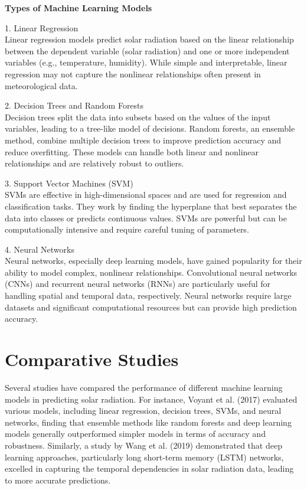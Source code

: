 \documentclass[12pt,a4paper]{report}
\begin{document}
\textbf{Types of Machine Learning Models}

1. Linear Regression\\
   Linear regression models predict solar radiation based on the linear relationship between the dependent variable (solar radiation) and one or more independent variables (e.g., temperature, humidity). While simple and interpretable, linear regression may not capture the nonlinear relationships often present in meteorological data.

2. Decision Trees and Random Forests\\
   Decision trees split the data into subsets based on the values of the input variables, leading to a tree-like model of decisions. Random forests, an ensemble method, combine multiple decision trees to improve prediction accuracy and reduce overfitting. These models can handle both linear and nonlinear relationships and are relatively robust to outliers.

3. Support Vector Machines (SVM)\\
   SVMs are effective in high-dimensional spaces and are used for regression and classification tasks. They work by finding the hyperplane that best separates the data into classes or predicts continuous values. SVMs are powerful but can be computationally intensive and require careful tuning of parameters.

4. Neural Networks\\
   Neural networks, especially deep learning models, have gained popularity for their ability to model complex, nonlinear relationships. Convolutional neural networks (CNNs) and recurrent neural networks (RNNs) are particularly useful for handling spatial and temporal data, respectively. Neural networks require large datasets and significant computational resources but can provide high prediction accuracy.

\section{Comparative Studies}

Several studies have compared the performance of different machine learning models in predicting solar radiation. For instance, Voyant et al. (2017) evaluated various models, including linear regression, decision trees, SVMs, and neural networks, finding that ensemble methods like random forests and deep learning models generally outperformed simpler models in terms of accuracy and robustness. Similarly, a study by Wang et al. (2019) demonstrated that deep learning approaches, particularly long short-term memory (LSTM) networks, excelled in capturing the temporal dependencies in solar radiation data, leading to more accurate predictions.
\end{document}
